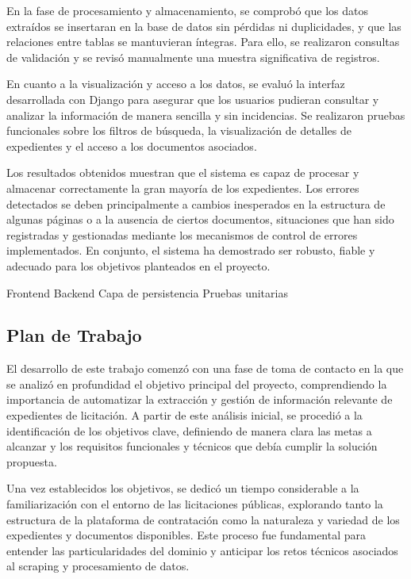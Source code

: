 \documentclass{article}
\begin{document}
En la fase de procesamiento y almacenamiento, se comprobó que los datos extraídos se insertaran en la base de datos sin pérdidas ni duplicidades, y que las relaciones entre tablas se mantuvieran íntegras. Para ello, se realizaron consultas de validación y se revisó manualmente una muestra significativa de registros.

En cuanto a la visualización y acceso a los datos, se evaluó la interfaz desarrollada con Django para asegurar que los usuarios pudieran consultar y analizar la información de manera sencilla y sin incidencias. Se realizaron pruebas funcionales sobre los filtros de búsqueda, la visualización de detalles de expedientes y el acceso a los documentos asociados.

Los resultados obtenidos muestran que el sistema es capaz de procesar y almacenar correctamente la gran mayoría de los expedientes. Los errores detectados se deben principalmente a cambios inesperados en la estructura de algunas páginas o a la ausencia de ciertos documentos, situaciones que han sido registradas y gestionadas mediante los mecanismos de control de errores implementados. En conjunto, el sistema ha demostrado ser robusto, fiable y adecuado para los objetivos planteados en el proyecto.

Frontend
Backend
Capa de persistencia
Pruebas unitarias



\subsection{Plan de Trabajo}
El desarrollo de este trabajo comenzó con una fase de toma de contacto en la que se analizó en profundidad el objetivo principal del proyecto, comprendiendo la importancia de automatizar la extracción y gestión de información relevante de expedientes de licitación. A partir de este análisis inicial, se procedió a la identificación de los objetivos clave, definiendo de manera clara las metas a alcanzar y los requisitos funcionales y técnicos que debía cumplir la solución propuesta.

Una vez establecidos los objetivos, se dedicó un tiempo considerable a la familiarización con el entorno de las licitaciones públicas, explorando tanto la estructura de la plataforma de contratación como la naturaleza y variedad de los expedientes y documentos disponibles. Este proceso fue fundamental para entender las particularidades del dominio y anticipar los retos técnicos asociados al scraping y procesamiento de datos.
\end{document}
